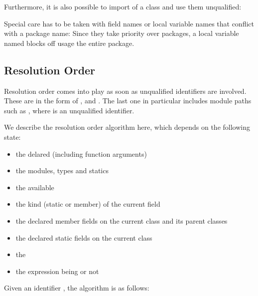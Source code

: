 Furthermore, it is also possible to import  of a class and use them unqualified:



Special care has to be taken with field names or local variable names that conflict with a package name: Since they take priority over packages, a local variable named  blocks off usage the entire  package.

\subsection{Resolution Order}
\label{type-system-resolution-order}

Resolution order comes into play as soon as unqualified identifiers are involved. These are  in the form of ,  and . The last one in particular includes module paths such as , where  is an unqualified identifier.  

We describe the resolution order algorithm here, which depends on the following state:

\begin{itemize}
	\item the delared  (including function arguments)
	\item the  modules, types and statics
	\item the available 
	\item the kind (static or member) of the current field
	\item the declared member fields on the current class and its parent classes
	\item the declared static fields on the current class
	\item the 
	\item the expression being  or not
\end{itemize}




Given an identifier , the algorithm is as follows:

